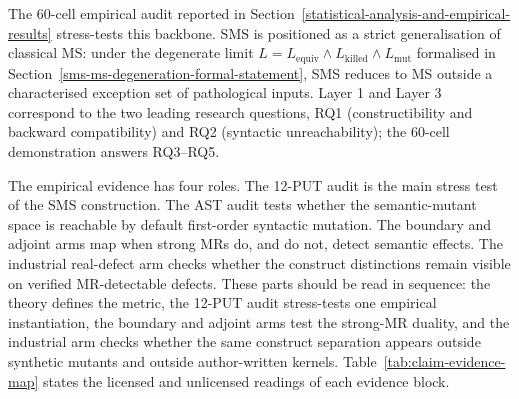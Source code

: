 \documentclass[manuscript,screen,review]{acmart}
\begin{document}
The 60-cell empirical audit reported in Section~\ref{statistical-analysis-and-empirical-results} stress-tests this
backbone. SMS is positioned as a strict generalisation of classical MS:
under the
degenerate limit $L = L_{\mathrm{equiv}} \wedge L_{\mathrm{killed}} \wedge L_{\mathrm{mut}}$
formalised in Section~\ref{sms-ms-degeneration-formal-statement}, SMS reduces to MS outside a
characterised exception set of pathological inputs. Layer 1 and
Layer 3 correspond to the two leading research questions, RQ1
(constructibility and backward compatibility) and RQ2 (syntactic
unreachability); the 60-cell demonstration answers RQ3--RQ5.

The empirical evidence has four roles. The 12-PUT audit is the main
stress test of the SMS construction. The AST audit tests whether the
semantic-mutant space is reachable by default first-order syntactic
mutation. The boundary and adjoint arms map when strong MRs do, and do
not, detect semantic effects. The industrial real-defect arm checks whether
the construct distinctions remain visible on verified MR-detectable defects.
These parts should be read in sequence: the theory defines the metric,
the 12-PUT audit stress-tests one empirical instantiation, the boundary
and adjoint arms test the strong-MR duality, and the industrial arm
checks whether the same construct separation appears outside synthetic
mutants and outside author-written kernels.
Table~\ref{tab:claim-evidence-map} states the licensed and unlicensed
readings of each evidence block.
\end{document}
